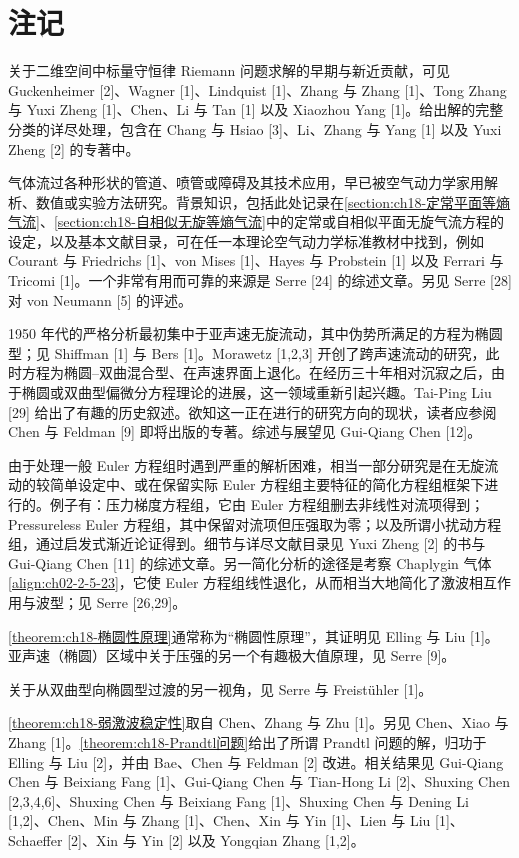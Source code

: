 \documentclass[../../main.tex]{subfiles}
\begin{document}
\section{注记}\label{section:ch18-注记}

关于二维空间中标量守恒律 Riemann 问题求解的早期与新近贡献，可见 Guckenheimer [2]、Wagner [1]、Lindquist [1]、Zhang 与 Zhang [1]、Tong Zhang 与 Yuxi Zheng [1]、Chen、Li 与 Tan [1] 以及 Xiaozhou Yang [1]。给出解的完整分类的详尽处理，包含在 Chang 与 Hsiao [3]、Li、Zhang 与 Yang [1] 以及 Yuxi Zheng [2] 的专著中。

气体流过各种形状的管道、喷管或障碍及其技术应用，早已被空气动力学家用解析、数值或实验方法研究。背景知识，包括此处记录在\cref{section:ch18-定常平面等熵气流}、\cref{section:ch18-自相似无旋等熵气流}中的定常或自相似平面无旋气流方程的设定，以及基本文献目录，可在任一本理论空气动力学标准教材中找到，例如 Courant 与 Friedrichs [1]、von Mises [1]、Hayes 与 Probstein [1] 以及 Ferrari 与 Tricomi [1]。一个非常有用而可靠的来源是 Serre [24] 的综述文章。另见 Serre [28] 对 von Neumann [5] 的评述。

1950 年代的严格分析最初集中于亚声速无旋流动，其中伪势所满足的方程为椭圆型；见 Shiffman [1] 与 Bers [1]。Morawetz [1,2,3] 开创了跨声速流动的研究，此时方程为椭圆--双曲混合型、在声速界面上退化。在经历三十年相对沉寂之后，由于椭圆或双曲型偏微分方程理论的进展，这一领域重新引起兴趣。Tai-Ping Liu [29] 给出了有趣的历史叙述。欲知这一正在进行的研究方向的现状，读者应参阅 Chen 与 Feldman [9] 即将出版的专著。综述与展望见 Gui-Qiang Chen [12]。

由于处理一般 Euler 方程组时遇到严重的解析困难，相当一部分研究是在无旋流动的较简单设定中、或在保留实际 Euler 方程组主要特征的简化方程组框架下进行的。例子有：压力梯度方程组，它由 Euler 方程组删去非线性对流项得到；Pressureless Euler 方程组，其中保留对流项但压强取为零；以及所谓小扰动方程组，通过启发式渐近论证得到。细节与详尽文献目录见 Yuxi Zheng [2] 的书与 Gui-Qiang Chen [11] 的综述文章。另一简化分析的途径是考察 Chaplygin 气体\eqref{align:ch02-2-5-23}，它使 Euler 方程组线性退化，从而相当大地简化了激波相互作用与波型；见 Serre [26,29]。

\cref{theorem:ch18-椭圆性原理}通常称为“椭圆性原理”，其证明见 Elling 与 Liu [1]。亚声速（椭圆）区域中关于压强的另一个有趣极大值原理，见 Serre [9]。

关于从双曲型向椭圆型过渡的另一视角，见 Serre 与 Freistühler [1]。

\cref{theorem:ch18-弱激波稳定性}取自 Chen、Zhang 与 Zhu [1]。另见 Chen、Xiao 与 Zhang [1]。\cref{theorem:ch18-Prandtl问题}给出了所谓 Prandtl 问题的解，归功于 Elling 与 Liu [2]，并由 Bae、Chen 与 Feldman [2] 改进。相关结果见 Gui-Qiang Chen 与 Beixiang Fang [1]、Gui-Qiang Chen 与 Tian-Hong Li [2]、Shuxing Chen [2,3,4,6]、Shuxing Chen 与 Beixiang Fang [1]、Shuxing Chen 与 Dening Li [1,2]、Chen、Min 与 Zhang [1]、Chen、Xin 与 Yin [1]、Lien 与 Liu [1]、Schaeffer [2]、Xin 与 Yin [2] 以及 Yongqian Zhang [1,2]。
\end{document}
